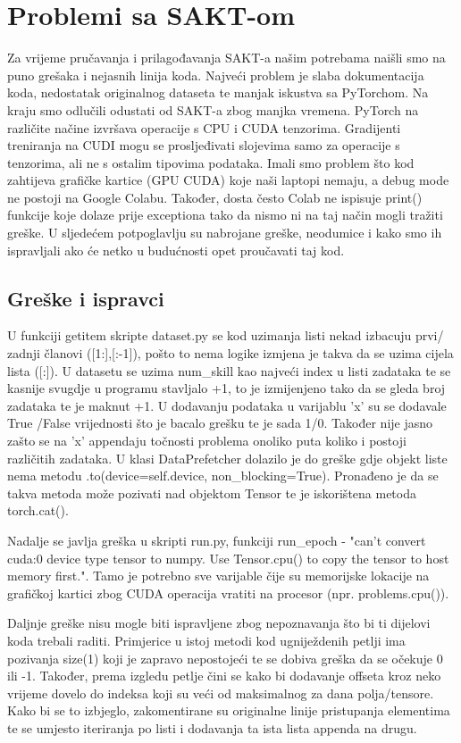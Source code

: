 	\section{Problemi sa SAKT-om}
	Za vrijeme pručavanja i prilagođavanja SAKT-a našim potrebama naišli smo na puno grešaka i nejasnih linija koda. Najveći problem je slaba dokumentacija koda, nedostatak originalnog dataseta te manjak iskustva sa PyTorchom.
	Na kraju smo odlučili odustati od SAKT-a zbog manjka vremena. PyTorch na različite načine izvršava operacije s CPU i CUDA tenzorima. Gradijenti treniranja na CUDI mogu se prosljeđivati slojevima samo za operacije s tenzorima, ali ne s ostalim tipovima podataka. Imali smo problem što kod zahtijeva grafičke kartice (GPU CUDA) koje naši laptopi nemaju, a debug mode ne postoji na Google Colabu. Također, dosta često Colab ne ispisuje print() funkcije koje dolaze prije exceptiona tako da nismo ni na taj način mogli tražiti greške. U sljedećem potpoglavlju su nabrojane greške, neodumice i kako smo ih ispravljali ako će netko u budućnosti opet proučavati taj kod.
	\subsection{Greške i ispravci}
	
		U funkciji getitem skripte dataset.py se kod uzimanja listi nekad izbacuju prvi/ zadnji članovi ([1:],[:-1]), pošto to nema logike izmjena je takva da se uzima cijela lista ([:]). U datasetu se uzima num\_skill kao najveći index u listi zadataka te se kasnije svugdje u programu stavljalo +1, to je izmijenjeno tako da se gleda broj zadataka te je maknut +1. U dodavanju podataka u varijablu 'x' su se dodavale True /False vrijednosti što je bacalo grešku te je sada 1/0. Također nije jasno zašto se na 'x' appendaju točnosti problema onoliko puta koliko i postoji različitih zadataka. U klasi DataPrefetcher dolazilo je do greške gdje objekt liste nema metodu .to(device=self.device, non\_blocking=True). Pronađeno je da se takva metoda može pozivati nad objektom Tensor te je iskorištena metoda torch.cat().
		
		Nadalje se javlja greška u skripti run.py, funkciji run\_epoch - "can't convert cuda:0 device type tensor to numpy. Use Tensor.cpu() to copy the tensor to host memory first.". Tamo je potrebno sve varijable čije su memorijske lokacije na grafičkoj kartici zbog CUDA operacija vratiti na procesor (npr. problems.cpu()).
		
		Daljnje greške nisu mogle biti ispravljene zbog nepoznavanja što bi ti dijelovi koda trebali raditi. Primjerice u istoj metodi kod ugniježdenih petlji ima pozivanja size(1) koji je zapravo nepostojeći te se dobiva greška da se očekuje 0 ili -1. Također, prema izgledu petlje čini se kako bi dodavanje offseta kroz neko vrijeme dovelo do indeksa koji su veći od maksimalnog za dana polja/tensore. Kako bi se to izbjeglo, zakomentirane su originalne linije pristupanja elementima te se umjesto iteriranja po listi i dodavanja ta ista lista appenda na drugu.
		
